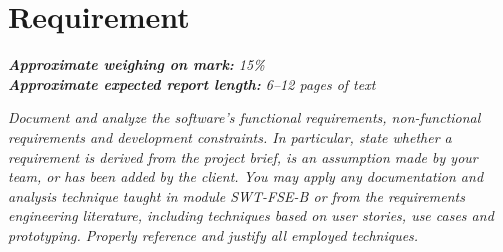 \section{Requirement}
\label{sec:requirements}

\emph{\textbf{Approximate weighing on mark:} 15\%}							\\
\emph{\textbf{Approximate expected report length:} 6--12 pages of text}

\emph{Document and analyze the software's functional requirements, 
non-functional requirements and development constraints. In particular, state 
whether a requirement is derived from the project brief, is an assumption made 
by your team, or has been added by the client. You may apply any documentation 
and analysis technique taught in module SWT-FSE-B or from the requirements 
engineering literature, including techniques based on user stories, use cases 
and prototyping. Properly reference and justify all employed techniques.}
